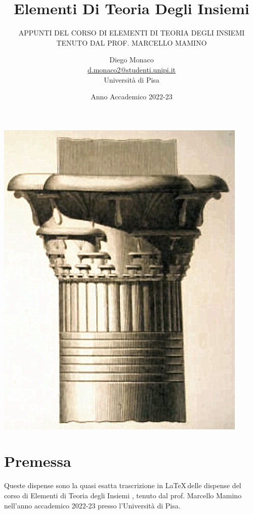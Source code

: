 \documentclass[11pt,headheight=35pt]{scrartcl}
\begin{document}
\title{Elementi Di Teoria Degli Insiemi}
\subtitle{\large\normalfont\rmfamily\scshape APPUNTI DEL CORSO DI ELEMENTI DI TEORIA DEGLI INSIEMI \\ TENUTO DAL PROF. MARCELLO MAMINO}
\author{Diego Monaco \\ \textnormal{\href{d.monaco2@studenti.unipi.it}{d.monaco2@studenti.unipi.it}} \\ Università di Pisa}
\date{Anno Accademico 2022-23}
\maketitle
\begin{center}
    \includegraphics[scale=4.0]{immagini/Cantor-like_Column_Capital_Ile_de_Philae_Description_d'Egypte_1809.jpg}
\end{center}
\newpage

\tableofcontents
\newpage

\section*{Premessa}
Queste dispense sono la quasi esatta trascrizione in \LaTeX\,delle dispense del corso di Elementi di Teoria degli Insiemi \cite{mamino_eti_22_23}, tenuto dal prof. Marcello Mamino nell'anno accademico 2022-23 presso l'Università di Pisa.
\end{document}
